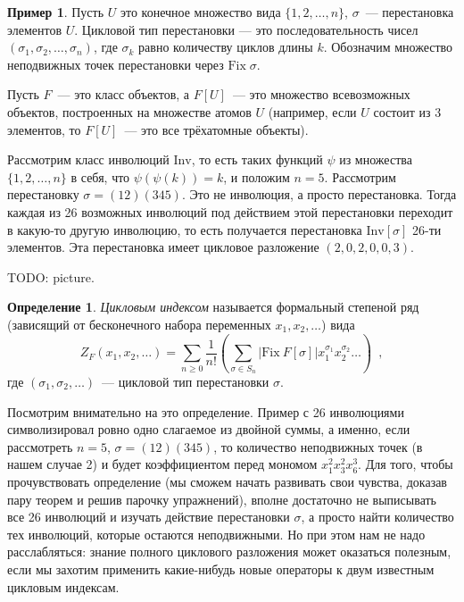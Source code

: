 \documentclass{article}
\theoremstyle{definition}
\newtheorem{example}{Пример}
\newtheorem*{definition}{Определение}
\begin{document}
\begin{example}
	Пусть \( U \) это конечное множество вида \( \{ 1, 2, \ldots, n \} \), \( 
	\sigma \)~--- перестановка элементов \( U \). Цикловой тип перестановки --- 
	это последовательность чисел \( (\sigma_1, \sigma_2, \ldots, \sigma_n) \), 
	где \( \sigma_k \) равно количеству циклов длины \( k \). Обозначим 
	множество неподвижных точек перестановки через \( \mathrm{Fix}\; \sigma \).
	
	Пусть \( F \)~--- это класс объектов, а \( F[U] \)~--- это множество 
	всевозможных объектов, построенных на множестве атомов \( U \) (например,
    если \( U \) состоит из \( 3 \) элементов, то \( F[U] \)~--- это все трёхатомные
    объекты).
	
	Рассмотрим класс инволюций \( \mathrm{Inv} \), то есть таких функций \( 
	\psi \) из множества \( \{ 1, 2, \ldots, n \} \) в себя, что \( 
	\psi(\psi(k)) = k \), и положим \( n = 5 \). Рассмотрим перестановку \( 
	\sigma = (12)(345) \). Это не инволюция, а просто перестановка.
    Тогда каждая из 26 возможных инволюций под действием 
	этой перестановки переходит в какую-то другую инволюцию, то есть получается 
	перестановка \( \mathrm{Inv}[\sigma] \) 26-ти элементов. Эта перестановка 
	имеет цикловое разложение \( (2,0,2,0,0,3) \).

    TODO: picture.
\end{example}

\begin{definition}
	\textit{Цикловым индексом} называется формальный степеной ряд (зависящий от 
	бесконечного набора переменных \( x_1, x_2, \ldots \)) вида
	\[
		Z_F(x_1, x_2, \ldots) = \sum_{n \geq 0} \dfrac{1}{n!} \left(
			\sum_{\sigma \in S_n} |\mathrm{Fix}\ F[\sigma]|x_1^{\sigma_1} 
			x_2^{\sigma_2} \ldots
		\right) \enspace ,
	\]
	где \( (\sigma_1, \sigma_2, \ldots) \)~--- цикловой тип перестановки \( 
	\sigma \).
\end{definition}

Посмотрим внимательно на это определение. Пример с 26 инволюциями символизировал
ровно одно слагаемое из двойной суммы, а именно, если рассмотреть \( n = 5 \),
\( \sigma = (12)(345) \), то количество неподвижных точек (в нашем случае 2) и
будет коэффициентом перед мономом \( x_1^2 x_3^2 x_6^3 \). Для того, чтобы
прочувствовать определение (мы сможем начать развивать свои чувства, доказав
пару теорем и решив парочку упражнений), вполне достаточно не выписывать все 26
инволюций и изучать действие перестановки \( \sigma \),  а просто найти
количество тех инволюций, которые остаются неподвижными. Но при этом нам не надо
расслабляться: знание полного циклового разложения может оказаться полезным,
если мы захотим применить какие-нибудь новые операторы к двум известным цикловым
индексам.
\end{document}
